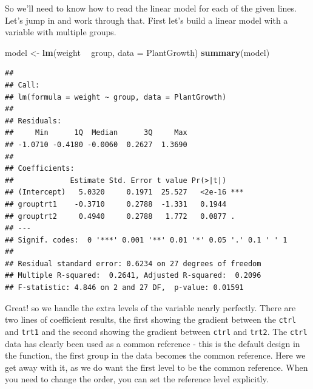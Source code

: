 \documentclass[
]{book}
\newenvironment{Shaded}{\begin{snugshade}}{\end{snugshade}}
\newcommand{\DataTypeTok}[1]{\textcolor[rgb]{0.13,0.29,0.53}{#1}}
\newcommand{\KeywordTok}[1]{\textcolor[rgb]{0.13,0.29,0.53}{\textbf{#1}}}
\newcommand{\NormalTok}[1]{#1}
\newcommand{\OperatorTok}[1]{\textcolor[rgb]{0.81,0.36,0.00}{\textbf{#1}}}
\newcommand{\StringTok}[1]{\textcolor[rgb]{0.31,0.60,0.02}{#1}}
\begin{document}
So we'll need to know how to read the linear model for each of the given lines.
Let's jump in and work through that. First let's build a linear model with a variable with multiple groups.

\begin{Shaded}
\begin{Highlighting}[]
\NormalTok{model <-}\StringTok{ }\KeywordTok{lm}\NormalTok{(weight }\OperatorTok{~}\StringTok{ }\NormalTok{group, }\DataTypeTok{data =}\NormalTok{ PlantGrowth)}
\KeywordTok{summary}\NormalTok{(model)}
\end{Highlighting}
\end{Shaded}

\begin{verbatim}
## 
## Call:
## lm(formula = weight ~ group, data = PlantGrowth)
## 
## Residuals:
##     Min      1Q  Median      3Q     Max 
## -1.0710 -0.4180 -0.0060  0.2627  1.3690 
## 
## Coefficients:
##             Estimate Std. Error t value Pr(>|t|)    
## (Intercept)   5.0320     0.1971  25.527   <2e-16 ***
## grouptrt1    -0.3710     0.2788  -1.331   0.1944    
## grouptrt2     0.4940     0.2788   1.772   0.0877 .  
## ---
## Signif. codes:  0 '***' 0.001 '**' 0.01 '*' 0.05 '.' 0.1 ' ' 1
## 
## Residual standard error: 0.6234 on 27 degrees of freedom
## Multiple R-squared:  0.2641,	Adjusted R-squared:  0.2096 
## F-statistic: 4.846 on 2 and 27 DF,  p-value: 0.01591
\end{verbatim}

Great! so we handle the extra levels of the variable nearly perfectly. There are two lines of coefficient results, the first showing the gradient between the \texttt{ctrl} and \texttt{trt1} and the second showing the gradient between \texttt{ctrl} and \texttt{trt2}. The \texttt{ctrl} data has clearly been used as a common reference - this is the default design in the function, the first group in the data becomes the common reference. Here we get away with it, as we do want the first level to be the common reference. When you need to change the order, you can set the reference level explicitly.

\begin{Shaded}
\end{Shaded}
\end{document}
